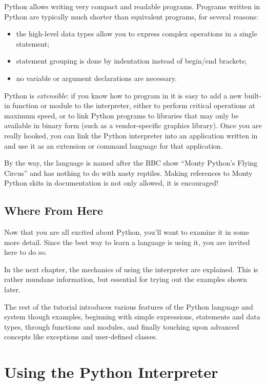 \documentclass{manual}
\begin{document}
Python allows writing very compact and readable programs.  Programs
written in Python are typically much shorter than equivalent \C{}
programs, for several reasons:
\begin{itemize}
\item
the high-level data types allow you to express complex operations in a
single statement;
\item
statement grouping is done by indentation instead of begin/end
brackets;
\item
no variable or argument declarations are necessary.
\end{itemize}

Python is \emph{extensible}: if you know how to program in \C{} it is easy
to add a new built-in function or module to the interpreter, either to
perform critical operations at maximum speed, or to link Python
programs to libraries that may only be available in binary form (such
as a vendor-specific graphics library).  Once you are really hooked,
you can link the Python interpreter into an application written in \C{}
and use it as an extension or command language for that application.

By the way, the language is named after the BBC show ``Monty Python's
Flying Circus'' and has nothing to do with nasty reptiles.  Making
references to Monty Python skits in documentation is not only allowed,
it is encouraged!

\section{Where From Here}
\label{where}

Now that you are all excited about Python, you'll want to examine it
in some more detail.  Since the best way to learn a language is
using it, you are invited here to do so.

In the next chapter, the mechanics of using the interpreter are
explained.  This is rather mundane information, but essential for
trying out the examples shown later.

The rest of the tutorial introduces various features of the Python
language and system though examples, beginning with simple
expressions, statements and data types, through functions and modules,
and finally touching upon advanced concepts like exceptions
and user-defined classes.

\chapter{Using the Python Interpreter}
\label{using}
\end{document}
